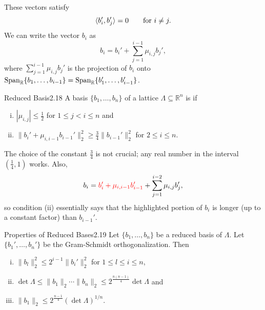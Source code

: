 \documentclass{Vorlesungstemplate_English} %
\begin{document}
\noindent These vectors satisfy
\[
\langle b_i', b_j'\rangle = 0
\qquad \text{for } i \neq j.
\]
We can write the vector $b_i$ as
\[ b_i = b_i' + \sum_{j=1}^{i-1} \mu_{i,j} b_j', \]
where $\displaystyle \sum_{j=1}^{i-1} \mu_{i,j} b_j'$ is the projection of $b_i$ onto $\text{Span}_{\mathbb{R}} \{ b_1, \dots, b_{i-1} \} = \text{Span}_{\mathbb{R}}\{ b_1', \dots, b_{i-1}'\}$.

\begin{definition}{Reduced Basis}{2.18}
    A basis $\{ b_1, \dots, b_n \}$ of a lattice $\Lambda \subseteq \mathbb{R}^n$ is  if
    \begin{enumerate}[(i)]
        \item $|\mu_{i,j}| \le \frac{1}{2}$ for $1 \le j < i \le n$ and
        \item $\|b_i' + \mu_{i,i-1} b_{i-1}'\|_2^2 \ge \frac{3}{4} \|b_{i-1}'\|_2^2$ for $2 \le i \le n$.
    \end{enumerate}
\end{definition}

 The choice of the constant $\frac{3}{4}$ is not crucial; any real number in the interval $(\frac{1}{4}, 1)$ works. Also,
\[ b_i = {\color{red} b_i' + \mu_{i,i-1}b_{i-1}'} + \sum_{j=1}^{i-2}\mu_{i,j}b_j',\]
so condition (ii) essentially says that the highlighted portion of $b_i$ is longer (up to a constant factor) than $b_{i-1}'$.

\begin{proposition}{Properties of Reduced Bases}{2.19}
    Let $\{ b_1, \dots, b_n \}$ be a reduced basis of $\Lambda$. Let $\{ b_1', \dots, b_n' \}$ be the Gram-Schmidt orthogonalization. Then
    \begin{enumerate}[(i)]
        \item $\|b_l\|_2^2 \le 2^{i-1} \|b_i'\|_2^2$ for $1 \le l \le i \le n$,
        \item $\det \Lambda \le \|b_1\|_2 \cdots \|b_n\|_2 \le 2^{\frac{n(n-1)}{4}} \det \Lambda$ and
        \item $\|b_1\|_2 \le 2^{\frac{n-1}{4}} (\det \Lambda)^{1/n}$.
    \end{enumerate}
\end{proposition}
\end{document}

